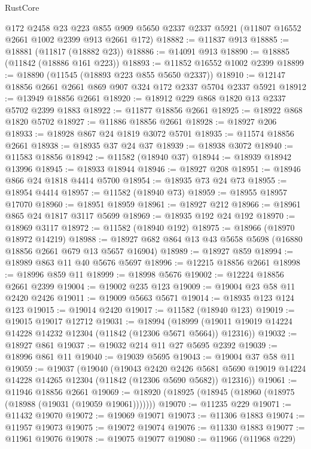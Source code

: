 \begin{lexlean}{RustCore}
\begin{coremodule}
    @172
    @2458
    @23
    @223
    @855
    @909
    @5650
    @2337
    @2337
    @5921
    (@11807 @16552 @2661 @1002 @2399 @913 @2661 @172)
@18882 := @11837 @913
@18885 := @18881 (@11817 (@18882 @23))
@18886 := @14091 @913
@18890 := @18885 (@11842 (@18886 @161 @223))
@18893 := @11852 @16552 @1002 @2399
@18899 := @18890 (@11545 (@18893 @223 @855 @5650 @2337))
@18910 := @12147 @18856 @2661 @2661 @869 @907 @324 @172 @2337 @5704 @2337 @5921
@18912 := @13949 @18856 @2661
@18920 := @18912 @229 @868 @1820 @13 @2337 @5702 @2399 @1883
@18922 := @11877 @18856 @2661
@18925 := @18922 @868 @1820 @5702
@18927 := @11886 @18856 @2661
@18928 := @18927 @206
@18933 := @18928 @867 @24 @1819 @3072 @5701
@18935 := @11574 @18856 @2661
@18938 := @18935 @37 @24 @37
@18939 := @18938 @3072
@18940 := @11583 @18856
@18942 := @11582 (@18940 @37)
@18944 := @18939 @18942 @13996
@18945 := @18933 @18944
@18946 := @18927 @208
@18951 := @18946 @866 @24 @1818 @4414 @5700
@18954 := @18935 @73 @24 @73
@18955 := @18954 @4414
@18957 := @11582 (@18940 @73)
@18959 := @18955 @18957 @17070
@18960 := @18951 @18959
@18961 := @18927 @212
@18966 := @18961 @865 @24 @1817 @3117 @5699
@18969 := @18935 @192 @24 @192
@18970 := @18969 @3117
@18972 := @11582 (@18940 @192)
@18975 := @18966 (@18970 @18972 @14219)
@18988 := @18927 @682 @864 @13 @43 @5658 @5698 (@16880 @18856 @2661 @679 @13 @5657 @16904)
@18989 := @18927 @859
@18994 := @18989 @863 @11 @40 @5676 @5697
@18996 := @12215 @18856 @2661
@18998 := @18996 @859 @11
@18999 := @18998 @5676
@19002 := @12224 @18856 @2661 @2399
@19004 := @19002 @235 @123
@19009 := @19004 @23 @58 @11 @2420 @2426
@19011 := @19009 @5663 @5671
@19014 := @18935 @123 @124 @123
@19015 := @19014 @2420
@19017 := @11582 (@18940 @123)
@19019 := @19015 @19017 @12712
@19031 := @18994
    (@18999 (@19011 @19019 @14224 @14228 @14232 @12304 (@11842 (@12306 @5671 @5664)) @12316))
@19032 := @18927 @861
@19037 := @19032 @214 @11 @27 @5695 @2392
@19039 := @18996 @861 @11
@19040 := @19039 @5695
@19043 := @19004 @37 @58 @11
@19059 := @19037
    (@19040
      (@19043
        @2420
        @2426
        @5681
        @5690
        @19019
        @14224
        @14228
        @14265
        @12304
        (@11842 (@12306 @5690 @5682))
        @12316))
@19061 := @11946 @18856 @2661
@19069 := @18920 (@18925 (@18945 (@18960 (@18975 (@18988 (@19031 (@19059 @19061)))))))
@19070 := @11235 @229
@19071 := @11432 @19070
@19072 := @19069 @19071
@19073 := @11306 @1883
@19074 := @11957 @19073
@19075 := @19072 @19074
@19076 := @11330 @1883
@19077 := @11961 @19076
@19078 := @19075 @19077
@19080 := @11966 (@11968 @229)

\end{coremodule}
\end{lexlean}

